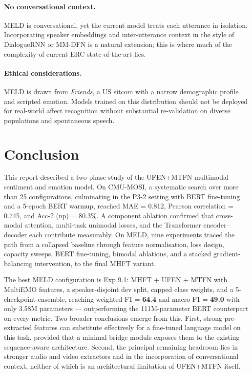 \documentclass[11pt,twocolumn]{article}
\begin{document}
\paragraph{No conversational context.} MELD is conversational, yet the current model treats each utterance in isolation. Incorporating speaker embeddings and inter-utterance context in the style of DialogueRNN or MM-DFN is a natural extension; this is where much of the complexity of current ERC state-of-the-art lies.

\paragraph{Ethical considerations.} MELD is drawn from \emph{Friends}, a US sitcom with a narrow demographic profile and scripted emotion. Models trained on this distribution should not be deployed for real-world affect recognition without substantial re-validation on diverse populations and spontaneous speech.

\section{Conclusion}
\label{sec:conclusion}

This report described a two-phase study of the UFEN+MTFN multimodal sentiment and emotion model. On CMU-MOSI, a systematic search over more than 25 configurations, culminating in the P3-2 setting with BERT fine-tuning and a 5-epoch BERT warmup, reached MAE = 0.812, Pearson correlation = 0.745, and Acc-2 (np) = 80.3\%. A component ablation confirmed that cross-modal attention, multi-task unimodal losses, and the Transformer encoder--decoder each contribute measurably. On MELD, nine experiments traced the path from a collapsed baseline through feature normalisation, loss design, capacity sweeps, BERT fine-tuning, bimodal ablations, and a stacked gradient-balancing intervention, to the final MHFT variant.

The best MELD configuration is Exp 9.1: MHFT + UFEN + MTFN with MultiEMO features, a speaker-disjoint dev split, capped class weights, and a 5-checkpoint ensemble, reaching weighted F1 = \textbf{64.4} and macro F1 = \textbf{49.0} with only 3.58M parameters --- outperforming the 111M-parameter BERT counterpart on every metric. Two broader conclusions emerge from this. First, strong pre-extracted features can substitute effectively for a fine-tuned language model on this task, provided that a minimal bridge module exposes them to the existing sequence-aware architecture. Second, the principal remaining headroom lies in stronger audio and video extractors and in the incorporation of conversational context, neither of which is an architectural limitation of UFEN+MTFN itself.
\end{document}
